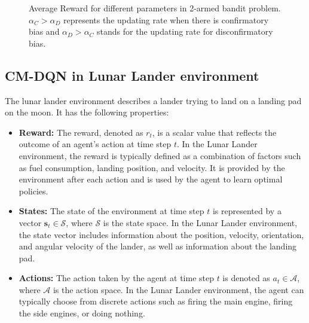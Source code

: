 \documentclass[10pt,letterpaper]{article}
\begin{document}
\begin{figure}[tp]
\label{figure:ex1}
\begin{center}
\end{center}
\caption{Average Reward for different parameters in 2-armed bandit problem. $\alpha_{C} > \alpha_{D}$ represents the updating rate when there is confirmatory bias and $\alpha_{D} > \alpha_{C}$ stands for the updating rate for disconfirmatory bias.} 
\label{ex1}
\end{figure}

\subsection{CM-DQN in Lunar Lander environment}
The lunar lander environment describes a lander trying to land on a landing pad on the moon. It has the following properties:

\begin{itemize}
\item \textbf{Reward:} The reward, denoted as $r_t$, is a scalar value that reflects the outcome of an agent's action at time step $t$. In the Lunar Lander environment, the reward is typically defined as a combination of factors such as fuel consumption, landing position, and velocity. It is provided by the environment after each action and is used by the agent to learn optimal policies.

\item \textbf{States:} The state of the environment at time step $t$ is represented by a vector $\mathbf{s}_t \in \mathcal{S}$, where $\mathcal{S}$ is the state space. In the Lunar Lander environment, the state vector includes information about the position, velocity, orientation, and angular velocity of the lander, as well as information about the landing pad. 

\item \textbf{Actions:} The action taken by the agent at time step $t$ is denoted as $a_t \in \mathcal{A}$, where $\mathcal{A}$ is the action space. In the Lunar Lander environment, the agent can typically choose from discrete actions such as firing the main engine, firing the side engines, or doing nothing.
\end{itemize}
\end{document}
